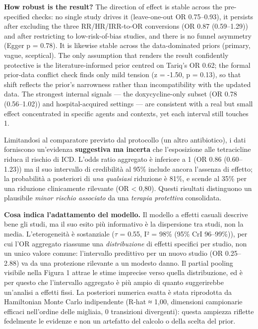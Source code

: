 \documentclass[
  letterpaper,
  DIV=11,
  numbers=noendperiod]{scrartcl}
\begin{document}
\textbf{How robust is the result?} The direction of effect is stable
across the pre-specified checks: no single study drives it
(leave-one-out OR 0.75--0.93), it persists after excluding the three
RR/HR/IRR-to-OR conversions (OR 0.87 (0.59--1.29)) and after restricting
to low-risk-of-bias studies, and there is no funnel asymmetry (Egger p =
0.78). It is likewise stable across the data-dominated priors (primary,
vague, sceptical). The only assumption that renders the result
confidently protective is the literature-informed prior centred on
Tariq's OR 0.62; the formal prior-data conflict check finds only mild
tension (z = -1.50, p = 0.13), so that shift reflects the prior's
narrowness rather than incompatibility with the updated data. The
strongest internal signals --- the doxycycline-only subset (OR 0.78
(0.56--1.02)) and hospital-acquired settings --- are consistent with a
real but small effect concentrated in specific agents and contexts, yet
each interval still touches 1.

Limitandosi al comparatore previsto dal protocollo (un altro
antibiotico), i dati forniscono un'evidenza \textbf{suggestiva ma
incerta} che l'esposizione alle tetracicline riduca il rischio di ICD.
L'odds ratio aggregato è inferiore a 1 (OR 0.86 (0.60--1.23)) ma il suo
intervallo di credibilità al 95\% include ancora l'assenza di effetto;
la probabilità a posteriori di \emph{una qualsiasi} riduzione è 81\%, e
scende al 35\% per una riduzione clinicamente rilevante (OR \textless{}
0,80). Questi risultati distinguono un plausibile \emph{minor rischio
associato} da una \emph{terapia protettiva} consolidata.

\textbf{Cosa indica l'adattamento del modello.} Il modello a effetti
casuali descrive bene gli studi, ma il suo esito più informativo è la
dispersione tra studi, non la media. L'eterogeneità è sostanziale
(\(\tau\) = 0.55, I² = 98\% (95\% CrI 96--99\%)), per cui l'OR aggregato
riassume una \emph{distribuzione} di effetti specifici per studio, non
un unico valore comune: l'intervallo predittivo per un nuovo studio (OR
0.25--2.88) va da una protezione rilevante a un modesto danno. Il
partial pooling visibile nella Figura 1 attrae le stime imprecise verso
quella distribuzione, ed è per questo che l'intervallo aggregato è più
ampio di quanto suggerirebbe un'analisi a effetti fissi. La posteriori
numerica esatta è stata riprodotta da Hamiltonian Monte Carlo
indipendente (R-hat ≈ 1,00, dimensioni campionarie efficaci nell'ordine
delle migliaia, 0 transizioni divergenti): questa ampiezza riflette
fedelmente le evidenze e non un artefatto del calcolo o della scelta del
prior.
\end{document}
